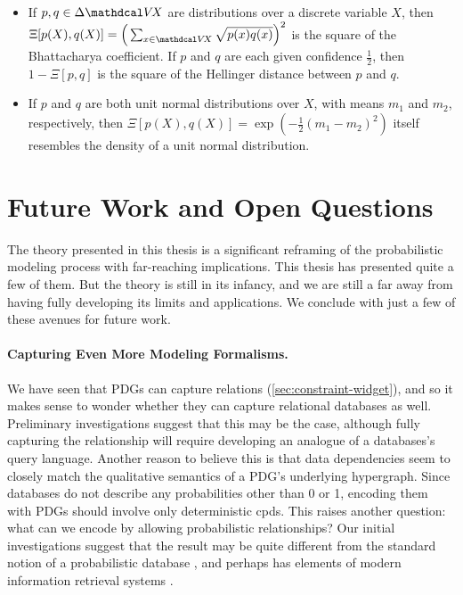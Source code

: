 \begin{itemize}
    \item If $p, q \in \Delta \V\!X$ are distributions over a discrete variable $X$, then
        $\Xi[ p(X), q(X)] = \Big( \sum_{x \in \V\!X} \sqrt{p(x) q(x)} \Big)^2$ is the square of the Bhattacharya coefficient. 
        If $p$ and $q$ are each given confidence $\frac12$, then $1-\Xi[p,q]$ is the square of the Hellinger distance between $p$ and $q$. 

    \item 
        If $p$ and $q$ are both unit normal distributions over $X$, 
        with means $m_1$ and $m_2$, respectively, then
        $\Xi[ p(X), q(X) ] = \exp( - \frac12 (m_1 - m_2)^2)$
        itself resembles the density of a unit normal distribution.
        
\end{itemize}


\section{Future Work and Open Questions}

The theory presented in this thesis is a significant reframing of the probabilistic modeling process with far-reaching implications.
This thesis has presented quite a few of them. 
But the theory is still in its infancy, 
    and we are still a far away from having fully developing its limits and applications. 
We conclude with just a few of these avenues for future work.

\paragraph{Capturing Even More Modeling Formalisms.}
We have seen that PDGs can capture relations (\cref{sec:constraint-widget}), and so it makes sense to wonder whether they can capture relational databases as well. 
Preliminary investigations suggest that this may be the case,
    although fully capturing the relationship will require developing an analogue of a databases's query language.  
Another reason to believe this is that data dependencies \citep{fagin-vardi} seem to closely match the qualitative semantics of a PDG's underlying hypergraph. 
Since databases do not describe any probabilities other than 0 or 1, 
    encoding them with PDGs should involve only deterministic cpds.
This raises another question: what can we encode by allowing probabilistic relationships?
Our initial investigations suggest that the result may be quite different from the standard notion of a probabilistic database \citep{suciu}, and perhaps has elements of modern information retrieval systems \citep{info-retrieval}.

